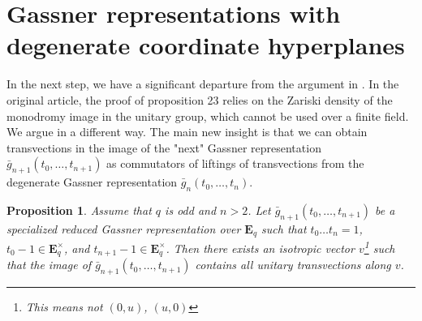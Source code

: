 \documentclass{article}
\newtheorem{proposition}[theorem]{Proposition}
\theoremstyle{definition}
\begin{document}
	\section{Gassner representations with degenerate coordinate hyperplanes} \label{next_degen}
	In the next step, we have a significant departure from the argument in \cite{cyclic}. In the original article, the proof of proposition 23 relies on the Zariski density of the monodromy image in the unitary group, which cannot be used over a finite field. We argue in a different way. The main new insight is that we can obtain transvections in the image of the "next" Gassner representation $\bar{g}_{n+1}(t_0, \ldots, t_{n+1})$ as commutators of liftings of transvections from the degenerate Gassner representation $\bar{g}_n(t_0, \ldots, t_n)$. 
	\begin{proposition} \label{next_transvect}
		Assume that $q$ is odd and $n > 2$. Let $\bar{g}_{n+1}(t_0, \ldots, t_{n+1})$ be a specialized reduced Gassner representation over $\mathbf{E}_q$ such that $t_0 \ldots t_n = 1$, $t_0 -1 \in \mathbf{E}_q^{\times}$, and $t_{n+1} - 1 \in \mathbf{E}_q^{\times}$. Then there exists an isotropic vector $v$\footnote{This means not $(0,u)$, $(u,0)$} such that the image of $\bar{g}_{n+1}(t_0, \ldots, t_{n+1})$ contains all unitary transvections along $v$.
	\end{proposition}
\end{document}
